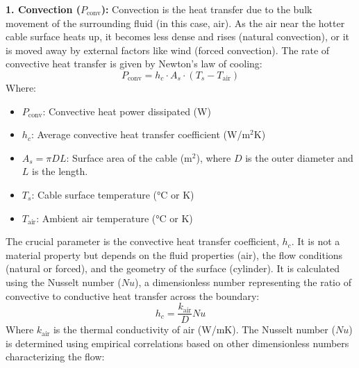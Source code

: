 \documentclass[12pt, a4paper]{article}
\begin{document}
\textbf{1. Convection ($P_{\text{conv}}$):}
Convection is the heat transfer due to the bulk movement of the surrounding fluid (in this case, air). As the air near the hotter cable surface heats up, it becomes less dense and rises (natural convection), or it is moved away by external factors like wind (forced convection). The rate of convective heat transfer is given by Newton's law of cooling:
\begin{equation}
P_{\text{conv}} = h_c \cdot A_s \cdot (T_s - T_{\text{air}})
\end{equation}
Where:
\begin{itemize}
    \item $P_{\text{conv}}$: Convective heat power dissipated (W)
    \item $h_c$: Average convective heat transfer coefficient (W/m$^2$K)
    \item $A_s = \pi D L$: Surface area of the cable (m$^2$), where $D$ is the outer diameter and $L$ is the length.
    \item $T_s$: Cable surface temperature (°C or K)
    \item $T_{\text{air}}$: Ambient air temperature (°C or K)
\end{itemize}
The crucial parameter is the convective heat transfer coefficient, $h_c$. It is not a material property but depends on the fluid properties (air), the flow conditions (natural or forced), and the geometry of the surface (cylinder). It is calculated using the Nusselt number ($Nu$), a dimensionless number representing the ratio of convective to conductive heat transfer across the boundary:
\begin{equation}
h_c = \frac{k_{\text{air}}}{D} Nu
\end{equation}
Where $k_{\text{air}}$ is the thermal conductivity of air (W/mK). The Nusselt number ($Nu$) is determined using empirical correlations based on other dimensionless numbers characterizing the flow:
\end{document}
